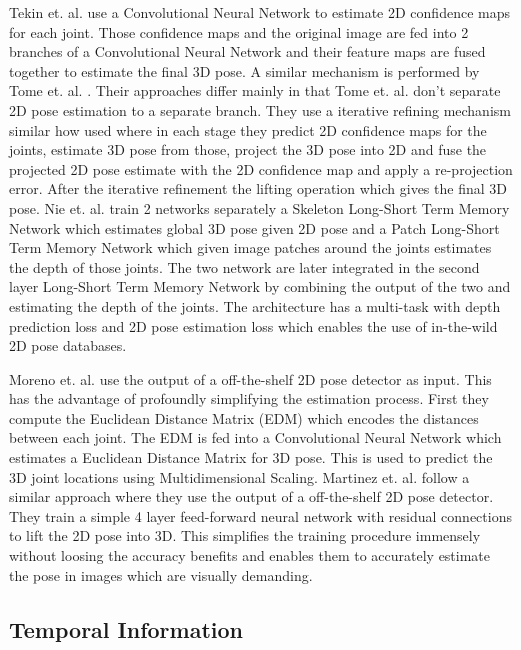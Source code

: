 Tekin et. al. \parencite{tekin2017learning} use a Convolutional Neural Network to estimate 2D confidence maps for each joint. Those confidence maps and the original image are fed into 2 branches of a Convolutional Neural Network and their feature maps are fused together to estimate the final 3D pose. A similar mechanism is performed by Tome et. al. \parencite{tome2017lifting}. Their approaches differ mainly in that Tome et. al. don't separate 2D pose estimation to a separate branch. They use a iterative refining mechanism similar how \parencite{newell2016stacked} used where in each stage they predict 2D confidence maps for the joints, estimate 3D pose from those, project the 3D pose into 2D and fuse the projected 2D pose estimate with the 2D confidence map and apply a re-projection error. After the iterative refinement the lifting operation which gives the final 3D pose. Nie et. al. \parencite{nie2017monocular} train 2 networks separately a Skeleton Long-Short Term Memory Network \parencite{hochreiter1997long} which estimates global 3D pose given 2D pose and a Patch Long-Short Term Memory Network which given image patches around the joints estimates the depth of those joints. The two network are later integrated in the second layer Long-Short Term Memory Network by combining the output of the two and estimating the depth of the joints. The architecture has a multi-task with depth prediction loss and 2D pose estimation loss which enables the use of in-the-wild 2D pose databases. 

Moreno et. al. \parencite{moreno20173d} use the output of a off-the-shelf 2D pose detector as input. This has the advantage of profoundly simplifying the estimation process. First they compute the Euclidean Distance Matrix (EDM) which encodes the distances between each joint. The EDM is fed into a Convolutional Neural Network which estimates a Euclidean Distance Matrix for 3D pose. This is used to predict the 3D joint locations using Multidimensional Scaling. Martinez et. al. \parencite{martinez2017simple} follow a similar approach where they use the output of a off-the-shelf 2D pose detector. They train a simple 4 layer feed-forward neural network with residual connections to lift the 2D pose into 3D. This simplifies the training procedure immensely without loosing the accuracy benefits and enables them to accurately estimate the pose in images which are visually demanding.

\subsection{Temporal Information}

